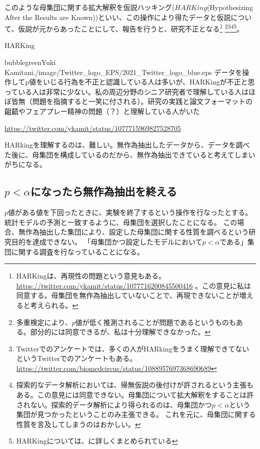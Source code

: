 このような母集団に関する拡大解釈を仮説ハッキング($HARKing$(Hypothesizing After the Results are Known))といい、この操作により得たデータと仮説について、仮説が元からあったことにして、報告を行うと、研究不正となる\footnote{
    HARKingは、再現性の問題という意見もある。
    \url{https://twitter.com/ykamit/status/1077716200845500416} 。この意見に私は同意する。母集団を無作為抽出していないことで、再現できないことが増えると考えられる。
}
\footnote{
    多重検定により、$p$値が低く推測されることが問題であるというものもある\cite{池田_功毅2016,中村_大輝2021sp20016}。部分的には同意できるが、私は十分理解できなかった。
}\footnote{
    Twitterでのアンケートでは、多くの人がHARkingをうまく理解できてないというTwitterでのアンケートもある。
    \url{https://twitter.com/biomedcircus/status/1088957697368690689}
}\footnote{
    探索的なデータ解析においては、帰無仮説の後付けが許されるという主張もある。この意見には同意できない。母集団について拡大解釈をすることは許されない。探索的データ解析により得られるのは、母集団かつ$p<\alpha$という集団が見つかったということのみ主張できる。
    これを元に、母集団に関する性質を言及してしまうのはおかしい。
}\footnote{
    HARKingについては、\cite{kerr1998harking}に詳しくまとめられている
}。


\begin{SMbox}{HARKing}
    \begin{rightbubbles}{bubblegreen}{Yuki Kamitani}{./image/Twitter_logo_EPS/2021_Twitter_logo_blue.eps}
    データを操作してp値をいじる行為を不正と認識している人は多いが、HARKingが不正と思っている人は非常に少ない。私の周辺分野のシニア研究者で理解している人はほぼ皆無（問題を指摘すると一笑に付される）。研究の実践と論文フォーマットの齟齬やフェアプレー精神の問題（？）と理解している人がいた
        \begin{flushright} 
            \small	\url{https://twitter.com/ykamit/status/1077715969827528705}
        \end{flushright}    
    \end{rightbubbles}

    HARkingを理解するのは、難しい。無作為抽出したデータから、データを調べた後に、母集団を構成しているのだから、無作為抽出できていると考えてしまいがちになる。
\end{SMbox}
  

\subsection{$p<\alpha$になったら無作為抽出を終える}
$p$値がある値を下回ったときに、実験を終了するという操作を行なったとする。
統計モデルの予測と一致するように、母集団を選択したことになる。
この場合、無作為抽出した集団により、設定した母集団に関する性質を調べるという研究目的を達成できない。
「母集団かつ設定したモデルにおいて$p<\alpha$である」集団に関する調査を行なっていることになる。


